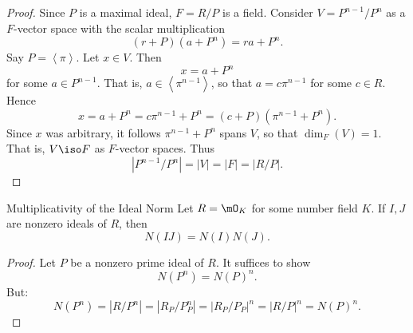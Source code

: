 \documentclass[pmath441]{subfiles}
\begin{document}
\begin{proof}
        Since $P$ is a maximal ideal, $F = R /P$ is a field. Consider $V = P^{n-1} /P^n$ as a $F$-vector space with the scalar multiplication
        \begin{equation*}
            \left( r+P \right)\left( a+P^n \right) = ra+P^n.
        \end{equation*}
        Say $P = \left< \pi \right>$. Let $x\in V$. Then
        \begin{equation*}
            x = a+P^n
        \end{equation*}
        for some $a\in P^{n-1}$. That is, $a \in\left< \pi^{n-1} \right>$, so that $a=c\pi^{n-1}$ for some $c\in R$. Hence
        \begin{equation*}
            x = a+P^n = c\pi^{n-1}+P^n = \left( c+P \right)\left( \pi^{n-1}+P^n \right).
        \end{equation*}
        Since $x$ was arbitrary, it follows $\pi^{n-1}+P^n$ spans $V$, so that $\dim_F\left( V \right) = 1$. That is, $V\iso F$ as $F$-vector spaces. Thus
        \begin{equation*}
            \left| P^{n-1} /P^n \right| = \left| V \right| = \left| F \right| = \left| R /P \right|.
        \end{equation*}
    \end{proof}
    
    \clearpage

    \begin{theorem}{Multiplicativity of the Ideal Norm}
        Let $R = \mO_K$ for some number field $K$. If $I,J$ are nonzero ideals of $R$, then
        \begin{equation*}
            N\left( IJ \right) = N\left( I \right)N\left( J \right).
        \end{equation*}
    \end{theorem}
    
    \begin{proof}
        Let $P$ be a nonzero prime ideal of $R$. It suffices to show
        \begin{equation*}
            N\left( P^n \right) = N\left( P \right)^n.
        \end{equation*}
        But:
        \begin{equation*}
            N\left( P^n \right) = \left| R /P^n \right| = \left| R_P /P_P^n \right| = \left| R_P /P_P \right|^n = \left| R /P \right|^n = N\left( P \right)^n.
        \end{equation*}
    \end{proof}
    
\end{document}
